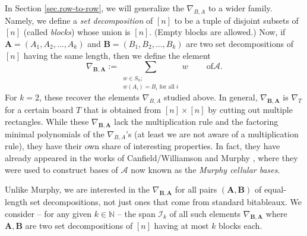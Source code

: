 \documentclass[numbers=enddot,12pt,final,onecolumn,notitlepage]{scrartcl}%
\numberwithin{exer}{subsection}
\theoremstyle{definition}
\let\sumnonlimits\sum
\renewcommand{\sum}{\sumnonlimits\limits}
\begin{document}
In Section \ref{sec.row-to-row}, we will generalize the $\nabla_{B,A}$ to a
wider family. Namely, we define a \emph{set decomposition} of $\left[
n\right]  $ to be a tuple of disjoint subsets of $\left[  n\right]  $ (called
\emph{blocks}) whose union is $\left[  n\right]  $. (Empty blocks are
allowed.) Now, if $\mathbf{A}=\left(  A_{1},A_{2},\ldots,A_{k}\right)  $ and
$\mathbf{B}=\left(  B_{1},B_{2},\ldots,B_{k}\right)  $ are two set
decompositions of $\left[  n\right]  $ having the same length, then we define
the element%
\[
\nabla_{\mathbf{B},\mathbf{A}}:=\sum_{\substack{w\in S_{n};\\w\left(
A_{i}\right)  =B_{i}\text{ for all }i}}w\ \ \ \ \ \ \ \ \ \ \text{of
}\mathcal{A}.
\]
For $k=2$, these recover the elements $\nabla_{B,A}$ studied above. In
general, $\nabla_{\mathbf{B},\mathbf{A}}$ is $\nabla_{T}$ for a certain board
$T$ that is obtained from $\left[  n\right]  \times\left[  n\right]  $ by
cutting out multiple rectangles. While these $\nabla_{\mathbf{B},\mathbf{A}}$
lack the multiplication rule and the factoring minimal polynomials of the
$\nabla_{B,A}$'s (at least we are not aware of a multiplication rule), they
have their own share of interesting properties. In fact, they have already
appeared in the works of Canfield/Williamson \cite{CanWil89} and Murphy
\cite{Murphy92,Murphy95}, where they were used to construct bases of
$\mathcal{A}$ now known as the \emph{Murphy cellular bases}.

Unlike Murphy, we are interested in the $\nabla_{\mathbf{B},\mathbf{A}}$ for
all pairs $\left(  \mathbf{A},\mathbf{B}\right)  $ of equal-length set
decompositions, not just ones that come from standard bitableaux. We consider
-- for any given $k\in\mathbb{N}$ -- the span $\mathcal{I}_{k}$ of all such
elements $\nabla_{\mathbf{B},\mathbf{A}}$ where $\mathbf{A},\mathbf{B}$ are
two set decompositions of $\left[  n\right]  $ having at most $k$ blocks each.
\end{document}
